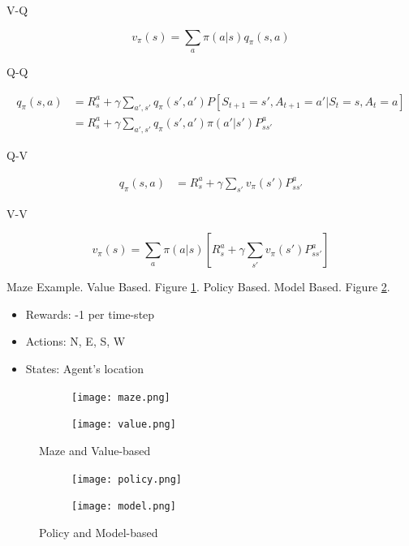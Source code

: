 \documentclass[english]{article}
\begin{document}
V-Q

$$v_\pi(s) = \sum_{a} \pi(a|s) q_\pi(s,a)$$

Q-Q

\begin{align*}
q_\pi(s,a) &= R_s^a +\gamma 
\sum_{a',s'} q_\pi(s',a')
P[S_{t+1}=s',A_{t+1} = a'|S_t = s, A_t=a]\\
&= R_s^a +\gamma 
\sum_{a',s'} q_\pi(s',a')
\pi(a'|s')P_{ss'}^a
\end{align*}

Q-V

\begin{align*}
q_\pi(s,a) &= R_s^a +\gamma 
\sum_{s'} v_\pi(s')P_{ss'}^a
\end{align*}

V-V

$$v_\pi(s) 
= \sum_{a} 
\pi(a|s) 
[R_s^a +\gamma 
\sum_{s'} v_\pi(s')P_{ss'}^a]$$




\item {Maze Example}. {Value Based}. Figure \ref{maze}. {Policy Based}. {Model Based}. Figure \ref{maze2}.


\begin{itemize}
    \item Rewards: -1 per time-step
    \item Actions: N, E, S, W
    \item States: Agent's location
\end{itemize}


\begin{figure}
\centering
\begin{subfigure}{.5\textwidth}
  \centering
  \texttt{[image: maze.png]}
\end{subfigure}%
\begin{subfigure}{.5\textwidth}
  \centering
  \texttt{[image: value.png]}
\end{subfigure}
\caption{Maze and Value-based}
\label{maze}
\end{figure}

\begin{figure}
\centering
\begin{subfigure}{.5\textwidth}
  \centering
  \texttt{[image: policy.png]}
\end{subfigure}%
\begin{subfigure}{.5\textwidth}
  \centering
  \texttt{[image: model.png]}
\end{subfigure}
\caption{Policy and Model-based}
\label{maze2}
\end{figure}
\end{document}
